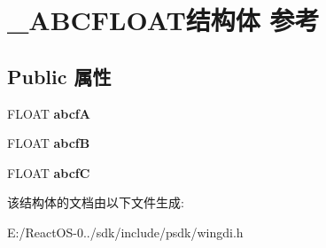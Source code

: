 \hypertarget{struct___a_b_c_f_l_o_a_t}{}\section{\+\_\+\+A\+B\+C\+F\+L\+O\+A\+T结构体 参考}
\label{struct___a_b_c_f_l_o_a_t}
\subsection*{Public 属性}
\begin{DoxyCompactItemize}
\item 
\mbox{\label{struct___a_b_c_f_l_o_a_t_a9042dbd12cea2ca74e172ce26f0a650b}} 
F\+L\+O\+AT {\bfseries abcfA}
\item 
\mbox{\label{struct___a_b_c_f_l_o_a_t_af3bbc237e51f1bc5700a16f9aeb21b51}} 
F\+L\+O\+AT {\bfseries abcfB}
\item 
\mbox{\label{struct___a_b_c_f_l_o_a_t_a98c558777bc208801c21a9941c8e0e0a}} 
F\+L\+O\+AT {\bfseries abcfC}
\end{DoxyCompactItemize}


该结构体的文档由以下文件生成\+:\begin{DoxyCompactItemize}
\item 
E\+:/\+React\+O\+S-\/0../sdk/include/psdk/wingdi.\+h\end{DoxyCompactItemize}
